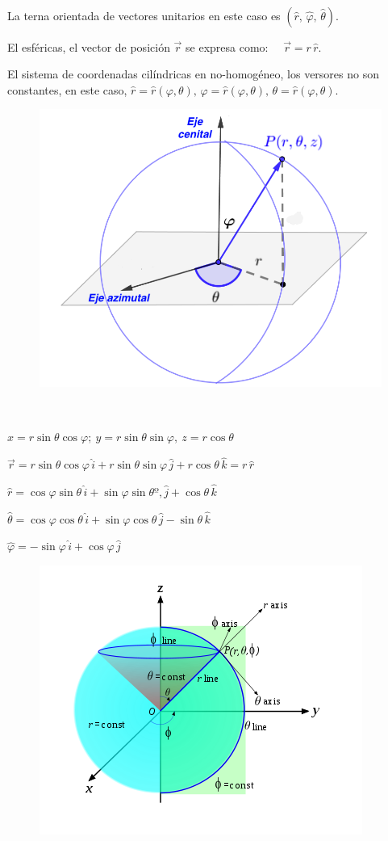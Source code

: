 \begin{multicols}{2}
$\quad$

La terna orientada de vectores unitarios en este caso es $(\widehat r,\, \widehat \varphi,\, \widehat \theta)$.

El esféricas, el vector de posición $\vec r$  se expresa como: $\quad \vec r=r\, \widehat r$.

El sistema de coordenadas cilíndricas en no-homogéneo, los versores no son constantes, en este caso, $\widehat r=\widehat r(\varphi, \theta), \,  \varphi=\widehat r(\varphi, \theta),\,  \theta=\widehat r(\varphi, \theta)$.

\begin{figure}[H]
	\centering
	\includegraphics[width=.45\textwidth]{img-coordenadas/coordenadas-09.png}
	\end{figure}
	
\end{multicols}



\begin{multicols}{2}
$\quad$

$x=r\sin \theta \cos \varphi;\ y=r\sin \theta \sin \varphi,\ z=r\cos \theta$

$\vec r= r\sin \theta \cos \varphi\, \widehat i+ r\sin \theta \sin \varphi\, \widehat j+ r\cos \theta \, \widehat k = r\, \widehat r$

\vspace{3mm}
$\widehat r= \cos \varphi \sin \theta \, \widehat i+ \sin \varphi \sin \theta º, \widehat j+ \cos \theta \, \widehat k$

$\widehat \theta= \cos \varphi \cos \theta \, \widehat i+ \sin \varphi \cos \theta \, \widehat j- \sin \theta \, \widehat k$

$\widehat \varphi= -\sin \varphi\, \widehat i + \cos \varphi \, \widehat j$

\begin{figure}[H]
	\centering
	\includegraphics[width=.5\textwidth]{img-coordenadas/coordenadas-10.png}
	\end{figure}

\end{multicols}

